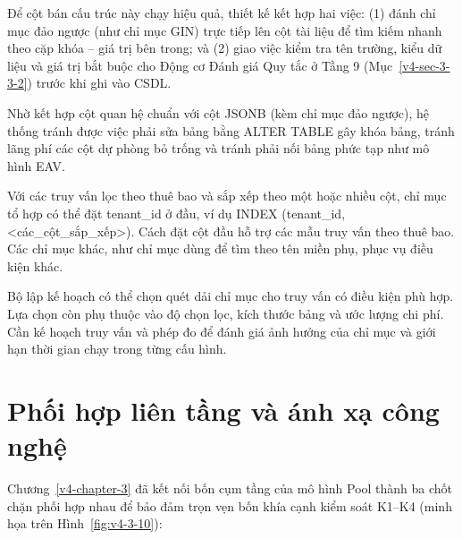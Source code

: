 Để cột bán cấu trúc này chạy hiệu quả, thiết kế kết hợp hai việc: (1) đánh chỉ mục đảo ngược (như chỉ mục GIN) trực tiếp lên cột tài liệu để tìm kiếm nhanh theo cặp khóa -- giá trị bên trong; và (2) giao việc kiểm tra tên trường, kiểu dữ liệu và giá trị bắt buộc cho Động cơ Đánh giá Quy tắc ở Tầng 9 (Mục~\ref{v4-sec-3-3-2}) trước khi ghi vào CSDL.

Nhờ kết hợp cột quan hệ chuẩn với cột JSONB (kèm chỉ mục đảo ngược), hệ thống tránh được việc phải sửa bảng bằng ALTER TABLE gây khóa bảng, tránh lãng phí các cột dự phòng bỏ trống và tránh phải nối bảng phức tạp như mô hình EAV.

Với các truy vấn lọc theo thuê bao và sắp xếp theo một hoặc nhiều cột, chỉ mục tổ hợp có thể đặt tenant\_\allowbreak{}id ở đầu, ví dụ INDEX (tenant\_\allowbreak{}id, \textless các\_\allowbreak{}cột\_\allowbreak{}sắp\_\allowbreak{}xếp\textgreater). Cách đặt cột đầu hỗ trợ các mẫu truy vấn theo thuê bao. Các chỉ mục khác, như chỉ mục dùng để tìm theo tên miền phụ, phục vụ điều kiện khác.

Bộ lập kế hoạch có thể chọn quét dải chỉ mục cho truy vấn có điều kiện phù hợp. Lựa chọn còn phụ thuộc vào độ chọn lọc, kích thước bảng và ước lượng chi phí. Cần kế hoạch truy vấn và phép đo để đánh giá ảnh hưởng của chỉ mục và giới hạn thời gian chạy trong từng cấu hình.

\section{Phối hợp liên tầng và ánh xạ công nghệ}\label{v4-sec-3-5}

Chương~\ref{v4-chapter-3} đã kết nối bốn cụm tầng của mô hình Pool thành ba chốt chặn phối hợp nhau để bảo đảm trọn vẹn bốn khía cạnh kiểm soát K1--K4 (minh họa trên Hình~\ref{fig:v4-3-10}):

